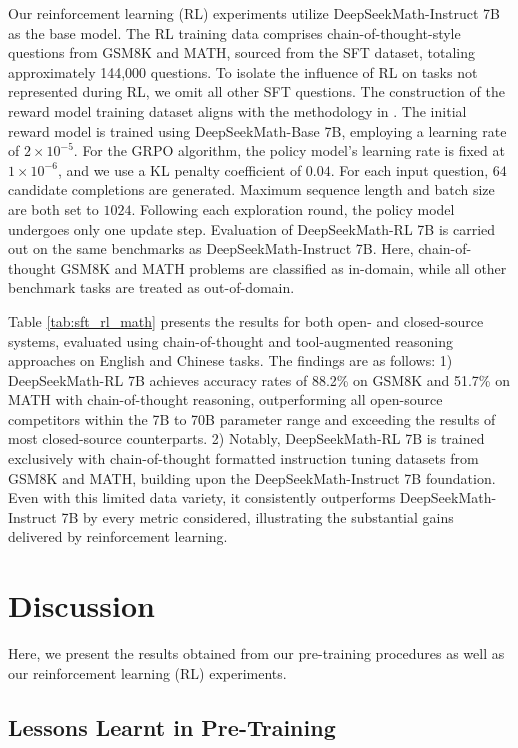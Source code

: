 \begin{itemize}[topsep=0pt]
\begin{itemize}[topsep=0pt]
Our reinforcement learning (RL) experiments utilize DeepSeekMath-Instruct 7B as the base model. The RL training data comprises chain-of-thought-style questions from GSM8K and MATH, sourced from the SFT dataset, totaling approximately 144,000 questions. To isolate the influence of RL on tasks not represented during RL, we omit all other SFT questions. The construction of the reward model training dataset aligns with the methodology in \citep{wang2023math}. The initial reward model is trained using DeepSeekMath-Base 7B, employing a learning rate of $2\times10^{-5}$. For the GRPO algorithm, the policy model's learning rate is fixed at $1\times10^{-6}$, and we use a KL penalty coefficient of $0.04$. For each input question, $64$ candidate completions are generated. Maximum sequence length and batch size are both set to $1024$. Following each exploration round, the policy model undergoes only one update step. Evaluation of DeepSeekMath-RL 7B is carried out on the same benchmarks as DeepSeekMath-Instruct 7B. Here, chain-of-thought GSM8K and MATH problems are classified as in-domain, while all other benchmark tasks are treated as out-of-domain.

Table \ref{tab:sft_rl_math} presents the results for both open- and closed-source systems, evaluated using chain-of-thought and tool-augmented reasoning approaches on English and Chinese tasks. The findings are as follows: 1) DeepSeekMath-RL 7B achieves accuracy rates of 88.2\% on GSM8K and 51.7\% on MATH with chain-of-thought reasoning, outperforming all open-source competitors within the 7B to 70B parameter range and exceeding the results of most closed-source counterparts. 2) Notably, DeepSeekMath-RL 7B is trained exclusively with chain-of-thought formatted instruction tuning datasets from GSM8K and MATH, building upon the DeepSeekMath-Instruct 7B foundation. Even with this limited data variety, it consistently outperforms DeepSeekMath-Instruct 7B by every metric considered, illustrating the substantial gains delivered by reinforcement learning.

\section{Discussion}
Here, we present the results obtained from our pre-training procedures as well as our reinforcement learning (RL) experiments.

\subsection{Lessons Learnt in Pre-Training}


\end{itemize}
\end{itemize}
